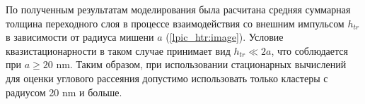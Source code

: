 
По полученным результатам моделирования была расчитана средняя суммарная толщина переходного слоя в процессе взаимодействия со внешним импульсом $h_{tr}$ в зависимости от радиуса мишени $a$ (\autoref{lpic_htr:image}). Условие квазистационарности в таком случае принимает вид $h_{tr} \ll 2a$, что соблюдается при $a \geq 20$ nm. Таким образом, при использовании стационарных вычислений для оценки углового рассеяния допустимо использовать только кластеры с радиусом 20 nm и больше.
